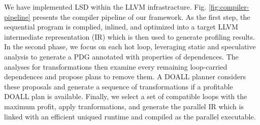 We have implemented LSD within the LLVM infrastracture. Fig.
\ref{fig:compiler-pipeline} presents the compiler pipeline of our framework. As
the first step, the sequential program is complied, inlined, and optimized into
a target LLVM intermediate representation (IR) which is then used to generate
profiling results. In the second phase, we focus on each hot loop, leveraging
static and speculative analysis to generate a PDG annotated with properties of
dependences. The analyses for transformations then examine every remaining
loop-carried dependences and propose plans to remove them. A DOALL planner
considers these proposals and generate a sequence of transformations if a
profitable DOALL plan is available. Finally, we select a set of compatible loops
with the maximum profit, apply tranformations, and generate the parallel IR
which is linked with an efficient uniqued runtime and compiled as the
parallel executable.
